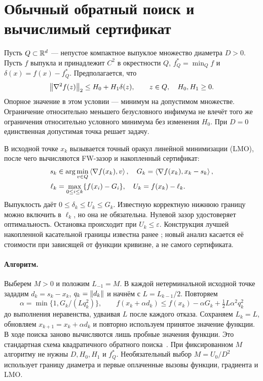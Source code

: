 \section{Обычный обратный поиск и вычислимый сертификат}
\label{sec:model}
Пусть $Q\subset\mathbb R^d$ — непустое компактное выпуклое множество диаметра
$D>0$. Пусть $f$ выпукла и принадлежит $C^2$ в окрестности $Q$,
$f_Q^*=\min_Q f$ и $\delta(x)=f(x)-f_Q^*$. Предполагается, что
\begin{equation}\label{eq:curvature}
 \left\|\nabla^2f(z)\right\|_2\le H_0+H_1\delta(z),\qquad z\in Q,
 \quad H_0,H_1\ge0.
\end{equation}
Опорное значение в этом условии — минимум на допустимом множестве.
Ограничение относительно меньшего безусловного инфимума не влечёт
того же ограничения относительно условного минимума без изменения
$H_0$. При $D=0$ единственная допустимая точка решает задачу.

В исходной точке $x_k$ вызывается точный оракул линейной минимизации
(LMO), после чего вычисляются FW-зазор и накопленный сертификат:
\begin{align}
 s_k&\in\arg\min_{v\in Q}\left\langle\nabla f(x_k),v\right\rangle,\quad
 G_k=\left\langle\nabla f(x_k),x_k-s_k\right\rangle,\label{eq:gap}\\
 \ell_k&=\max_{0\le i\le k}\{f(x_i)-G_i\},\quad
 U_k=f(x_k)-\ell_k.\label{eq:certificate}
\end{align}
Выпуклость даёт $0\le\delta_k\le U_k\le G_k$. Известную корректную
нижнюю границу можно включить в $\ell_k$, но она не обязательна.
Нулевой зазор удостоверяет оптимальность. Остановка происходит при
$U_k\le\varepsilon$.
Конструкция лучшей накопленной касательной границы известна ранее
\cite[метод 1, соглашение о максимизации]{freundgrigas}; новый анализ
касается её стоимости при зависящей от функции кривизне, а не самого
сертификата.

\paragraph{Алгоритм.}
Выберем $M>0$ и положим $L_{-1}=M$. В каждой нетерминальной исходной
точке зададим $d_k=s_k-x_k$, $q_k=\left\|d_k\right\|$ и начнём с
$L=L_{k-1}/2$. Повторяем
\begin{equation}\label{eq:btstep}
 \alpha=\min\{1,G_k/(Lq_k^2)\},\qquad
 f(x_k+\alpha d_k)\le f(x_k)-\alpha G_k
                         +\tfrac12L\alpha^2q_k^2
\end{equation}
до выполнения неравенства, удваивая $L$ после каждого отказа.
Сохраняем $L_k=L$, обновляем $x_{k+1}=x_k+\alpha d_k$ и повторно
используем принятое значение функции. В ходе поиска заново вычисляются
лишь пробные значения функции. Это стандартная схема квадратичного
обратного поиска~\cite{pedregosa}. При фиксированном $M$ алгоритму не
нужны $D,H_0,H_1$ и $f_Q^*$. Необязательный выбор $M=U_0/D^2$
использует границу диаметра и первые оплаченные вызовы функции,
градиента и LMO.

